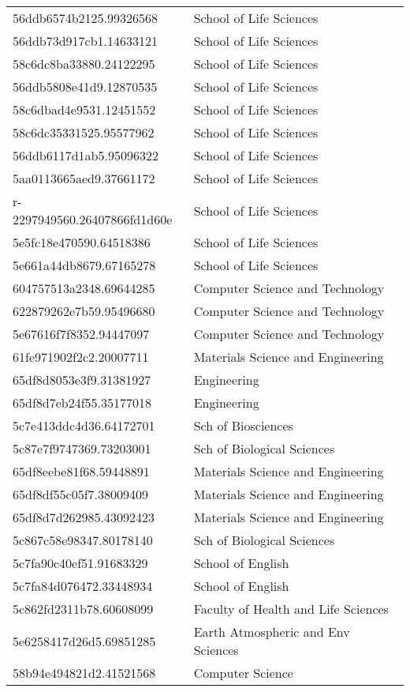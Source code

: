 \begin{tabular}{ll}
56ddb6574b2125.99326568 & School of Life Sciences \\
56ddb73d917cb1.14633121 & School of Life Sciences \\
58c6dc8ba33880.24122295 & School of Life Sciences \\
56ddb5808e41d9.12870535 & School of Life Sciences \\
58c6dbad4e9531.12451552 & School of Life Sciences \\
58c6dc35331525.95577962 & School of Life Sciences \\
56ddb6117d1ab5.95096322 & School of Life Sciences \\
5aa0113665aed9.37661172 & School of Life Sciences \\
r-2297949560.26407866fd1d60e & School of Life Sciences \\
5e5fc18e470590.64518386 & School of Life Sciences \\
5e661a44db8679.67165278 & School of Life Sciences \\
604757513a2348.69644285 & Computer Science and Technology \\
622879262e7b59.95496680 & Computer Science and Technology \\
5e67616f7f8352.94447097 & Computer Science and Technology \\
61fe971902f2c2.20007711 & Materials Science and Engineering \\
65df8d8053e3f9.31381927 & Engineering \\
65df8d7eb24f55.35177018 & Engineering \\
5c7e413ddc4d36.64172701 & Sch of Biosciences \\
5c87e7f9747369.73203001 & Sch of Biological Sciences \\
65df8eebe81f68.59448891 & Materials Science and Engineering \\
65df8df55c05f7.38009409 & Materials Science and Engineering \\
65df8d7d262985.43092423 & Materials Science and Engineering \\
5c867c58e98347.80178140 & Sch of Biological Sciences \\
5c7fa90c40ef51.91683329 & School of English \\
5c7fa84d076472.33448934 & School of English \\
5c862fd2311b78.60608099 & Faculty of Health and Life Sciences \\
5e6258417d26d5.69851285 & Earth Atmospheric and Env Sciences \\
58b94e494821d2.41521568 & Computer Science \\

\end{tabular}
